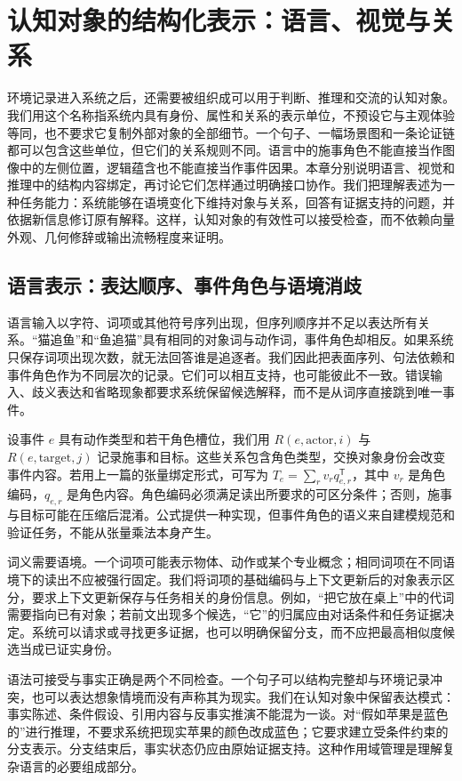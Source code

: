 \chapter{认知对象的结构化表示：语言、视觉与关系}
\label{chp:semantic_anatomy}

环境记录进入系统之后，还需要被组织成可以用于判断、推理和交流的认知对象。我们用这个名称指系统内具有身份、属性和关系的表示单位，不预设它与主观体验等同，也不要求它复制外部对象的全部细节。一个句子、一幅场景图和一条论证链都可以包含这些单位，但它们的关系规则不同。语言中的施事角色不能直接当作图像中的左侧位置，逻辑蕴含也不能直接当作事件因果。本章分别说明语言、视觉和推理中的结构内容绑定，再讨论它们怎样通过明确接口协作。我们把理解表述为一种任务能力：系统能够在语境变化下维持对象与关系，回答有证据支持的问题，并依据新信息修订原有解释。这样，认知对象的有效性可以接受检查，而不依赖向量外观、几何修辞或输出流畅程度来证明。

\section{语言表示：表达顺序、事件角色与语境消歧}
\label{sec:language_structure}

语言输入以字符、词项或其他符号序列出现，但序列顺序并不足以表达所有关系。“猫追鱼”和“鱼追猫”具有相同的对象词与动作词，事件角色却相反。如果系统只保存词项出现次数，就无法回答谁是追逐者。我们因此把表面序列、句法依赖和事件角色作为不同层次的记录。它们可以相互支持，也可能彼此不一致。错误输入、歧义表达和省略现象都要求系统保留候选解释，而不是从词序直接跳到唯一事件。

设事件 $e$ 具有动作类型和若干角色槽位，我们用 $R(e,\mathrm{actor},i)$ 与 $R(e,\mathrm{target},j)$ 记录施事和目标。这些关系包含角色类型，交换对象身份会改变事件内容。若用上一篇的张量绑定形式，可写为 $T_e=\sum_r v_r q_{e,r}^{\mathsf T}$，其中 $v_r$ 是角色编码，$q_{e,r}$ 是角色内容。角色编码必须满足读出所要求的可区分条件；否则，施事与目标可能在压缩后混淆。公式提供一种实现，但事件角色的语义来自建模规范和验证任务，不能从张量乘法本身产生。

词义需要语境。一个词项可能表示物体、动作或某个专业概念；相同词项在不同语境下的读出不应被强行固定。我们将词项的基础编码与上下文更新后的对象表示区分，要求上下文更新保存与任务相关的身份信息。例如，“把它放在桌上”中的代词需要指向已有对象；若前文出现多个候选，“它”的归属应由对话条件和任务证据决定。系统可以请求或寻找更多证据，也可以明确保留分支，而不应把最高相似度候选当成已证实身份。

语法可接受与事实正确是两个不同检查。一个句子可以结构完整却与环境记录冲突，也可以表达想象情境而没有声称其为现实。我们在认知对象中保留表达模式：事实陈述、条件假设、引用内容与反事实推演不能混为一谈。对“假如苹果是蓝色的”进行推理，不要求系统把现实苹果的颜色改成蓝色；它要求建立受条件约束的分支表示。分支结束后，事实状态仍应由原始证据支持。这种作用域管理是理解复杂语言的必要组成部分。

